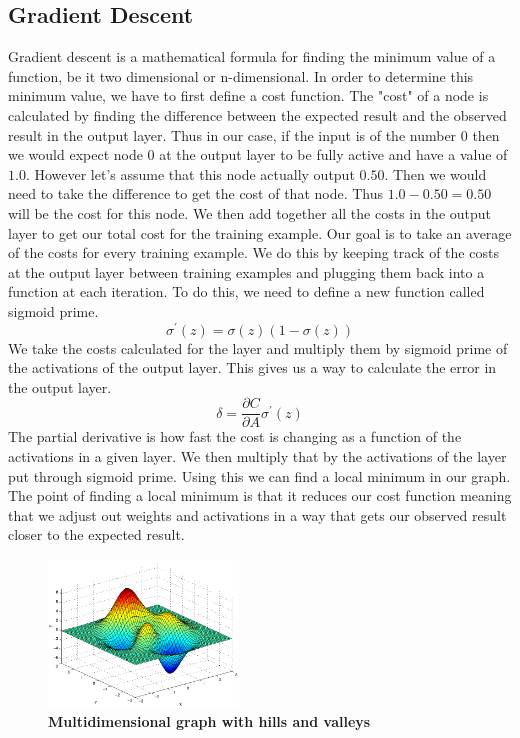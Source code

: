\documentclass[12pt]{article}
\theoremstyle{definition}
\theoremstyle{plain}
\begin{document}
\subsection{Gradient Descent}
Gradient descent is a mathematical formula for finding the minimum value of a function, be it two dimensional or n-dimensional. In order to determine this minimum value, we have to first define a cost function. The "cost" of a node is calculated by finding the difference between the expected result and the observed result in the output layer. Thus in our case, if the input is of the number 0 then we would expect node 0 at the output layer to be fully active and have a value of $1.0$. However let's assume that this node actually output $0.50$. Then we would need to take the difference to get the cost of that node. Thus $1.0-0.50 = 0.50$ will be the cost for this node. We then add together all the costs in the output layer to get our total cost for the training example. Our goal is to take an average of the costs for every training example. We do this by keeping track of the costs at the output layer between training examples and plugging them back into a function at each iteration. To do this, we need to define a new function called sigmoid prime\cite{welch_2015}.
\begin{equation}\label{eqn:SigmoidPrime}
\sigma^\prime(z) = \sigma(z)(1-\sigma(z))
\end{equation}
We take the costs calculated for the layer and multiply them by sigmoid prime of the activations of the output layer. This gives us a way to calculate the error in the output layer\cite{nielsen_2017}.
\begin{equation}\label{eqn:Delta}
\delta = \dfrac{\partial C}{\partial A}\sigma^\prime(z)
\end{equation}
The partial derivative is how fast the cost is changing as a function of the activations in a given layer. We then multiply that by the activations of the layer put through sigmoid prime.  Using this we can find a local minimum in our graph. The point of finding a local minimum is that it reduces our cost function meaning that we adjust out weights and activations in a way that gets our observed result closer to the expected result. 
\begin{figure}
	\centering
	\includegraphics[width=0.45\textwidth]{Images/Gradient.png}
	\caption{\textbf{Multidimensional graph with hills and valleys} \cite{steemit}}
	\label{fig:Gradient}
\end{figure}
\end{document}
